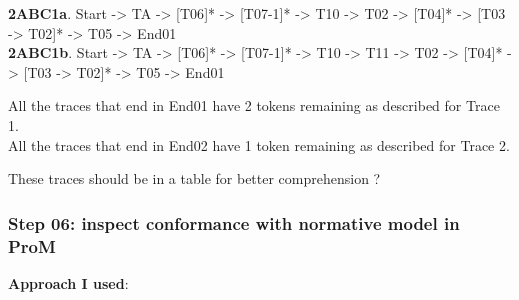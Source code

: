 \documentclass[]{article}
\begin{document}
\textbf{2ABC1a}. Start -\textgreater{} TA -\textgreater{} {[}T06{]}*
-\textgreater{} {[}T07-1{]}* -\textgreater{} T10 -\textgreater{} T02
-\textgreater{} {[}T04{]}* -\textgreater{} {[}T03 -\textgreater{}
T02{]}* -\textgreater{} T05 -\textgreater{} End01\\\textbf{2ABC1b}.
Start -\textgreater{} TA -\textgreater{} {[}T06{]}* -\textgreater{}
{[}T07-1{]}* -\textgreater{} T10 -\textgreater{} T11 -\textgreater{} T02
-\textgreater{} {[}T04{]}* -\textgreater{} {[}T03 -\textgreater{}
T02{]}* -\textgreater{} T05 -\textgreater{} End01

All the traces that end in End01 have 2 tokens remaining as described
for Trace 1.\\All the traces that end in End02 have 1 token remaining as
described for Trace 2.

These traces should be in a table for better comprehension ?

\subsubsection{Step 06: inspect conformance with normative model in
ProM}\label{step-06-inspect-conformance-with-normative-model-in-prom}

\textbf{Approach I used}:
\end{document}
